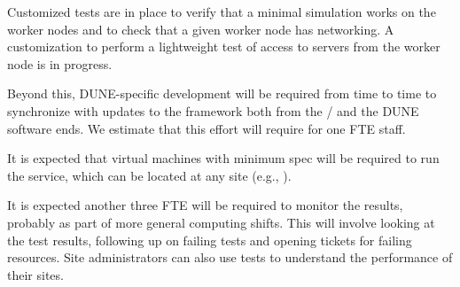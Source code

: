 \documentclass[../main-v1.tex]{subfiles}
\begin{document}

\begin{comment} see below (anne)
Some customization of the tests has been done, and  further changes being planned, which are :
\begin{enumerate}
    \item Minimal simulation to test that a simulation works on the worker nodes (Done)
    \item Checking if a given worker node has ipv6 networking (Done)
    \item Lightweight test of access to rucio servers from the worker node (ongoing)
\end{enumerate}
\end{comment}

Customized tests are in place to verify that a minimal simulation works on the worker nodes and to check that a given worker node has  networking. A customization to perform a lightweight test of access to   servers from the worker node is in progress.

Beyond this, DUNE-specific development will be required from time to time %
to synchronize with updates to the framework both from the  /  and the DUNE software ends. %
We estimate that this effort will require for one FTE staff. %

It is expected that  virtual machines with minimum spec  will be required to run the service,  which can be located at any site (e.g., ).

It is expected another three FTE will be required to monitor the  results, probably as part of more general computing shifts. This will involve looking at the test results, following up on failing tests and opening tickets for failing resources. Site administrators can also use  tests to understand the performance of their sites. %
\end{document}
